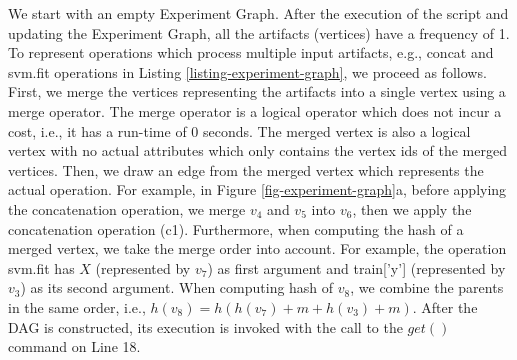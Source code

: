 We start with an empty Experiment Graph.
After the execution of the script and updating the Experiment Graph, all the artifacts (vertices) have a frequency of 1.
To represent operations which process multiple input artifacts, e.g., concat and svm.fit operations in Listing \ref{listing-experiment-graph}, we proceed as follows.
First, we merge the vertices representing the artifacts into a single vertex using a merge operator.
The merge operator is a logical operator which does not incur a cost, i.e., it has a run-time of 0 seconds.
The merged vertex is also a logical vertex with no actual attributes which only contains the vertex ids of the merged vertices.
Then, we draw an edge from the merged vertex which represents the actual operation.
For example, in Figure \ref{fig-experiment-graph}a, before applying the concatenation operation, we merge $v_4$ and $v_5$ into $v_6$, then we apply the concatenation operation (c1).
Furthermore, when computing the hash of a merged vertex, we take the merge order into account.
For example, the operation svm.fit has $X$ (represented by $v_7$) as first argument and train['y'] (represented by $v_3$) as its second argument.
When computing hash of $v_8$, we combine the parents in the same order, i.e., $h(v_8) = h(h(v_7) + m + h(v_3) + m)$. 
After the DAG is constructed, its execution is invoked with the call to the $get()$ command on Line 18.

